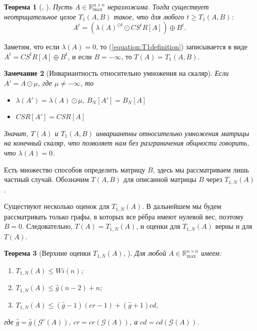 \documentclass[12pt]{article}
\newtheorem{theorem}{Теорема}[section]
\newtheorem{remark}[theorem]{Замечание}
\begin{document}
\begin{theorem}[\cite{bounds}, \cite{15WeakCSRExpantion}]
\label{theorem:weakCSRexpantionTheorem}
Пусть $A \in \mathbb{R}_{\max}^{n \times n}$ неразложима. Тогда существует неотрицательное целое $T_1(A, B)$  такое, что для любого $t \ge T_1(A, B)$:
\begin{equation}
\label{equation:T1definition}
    A^t = (\lambda(A)^{\odot t} \odot CS^tR[A]) \oplus B^t.
\end{equation}
\end{theorem}

Заметим, что если $\lambda(A) = 0$, то (\ref{equation:T1definition}) записывается в виде $A^t = CS^tR[A] \oplus B^t$, и если $B = -\infty$, то $T(A) = T_1(A, B)$.

\begin{remark}[Инвариантность относительно умножения на скаляр]
\label{invarianceOfT}
Если $A' = A \odot \mu$, где $\mu \ne -\infty$, то

\begin{itemize}
	\item $\lambda(A') = \lambda(A) \odot \mu$, $B_N[A'] = B_N[A]$
	\item $CSR[A'] = CSR[A]$
\end{itemize}

Значит, $T(A)$ и $T_1(A, B)$ инвариантны относительно умножения матрицы на конечный скаляр, что позволяет нам без разграничения общности говорить, что $\lambda(A) = 0$.
\end{remark}

Есть множество способов определить матрицу $B$, здесь мы рассматриваем лишь частный случай. Обозначим $T(A, B)$ для описанной матрицы $B$ через $T_{1, N}(A)$.

Существуют несколько оценок для $T_{1, N}(A)$. В дальнейшем мы будем рассматривать только графы, в которых все рёбра имеют нулевой вес, поэтому $B = 0$. Следовательно, $T(A) = T_{1, N}(A)$, и оценки для $T_{1, N}(A)$ верны и для $T(A)$.

\begin{theorem}[Верхние оценки $T_{1, N}(A)$, \cite{15WeakCSRExpantion}]
Для любой $A \in \mathbb{R}_{\max}^{n \times n}$ имеем:
\begin{enumerate} 
    \item $T_{1, N}(A) \le Wi(n)$;
    \item $T_{1, N}(A) \le \hat{g}(n - 2) + n$;
    \item $T_{1, N}(A) \le (\hat{g} - 1)(cr - 1) + (\hat{g} + 1) cd$,
\end{enumerate}
где $\hat{g} = \hat{g}(\mathcal{G}^c(A))$, $cr = cr(\mathcal{G}(A))$, а $cd = cd(\mathcal{G}(A))$.
\end{theorem}
\end{document}
